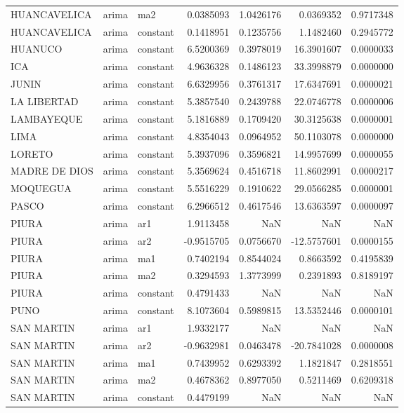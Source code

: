 \documentclass[
]{article}
\begin{document}
\begin{table}[!h]
\begin{tabular}[t]{lllrrrr}
\addlinespace
HUANCAVELICA & arima & ma2 & 0.0385093 & 1.0426176 & 0.0369352 & 0.9717348\\
HUANCAVELICA & arima & constant & 0.1418951 & 0.1235756 & 1.1482460 & 0.2945772\\
HUANUCO & arima & constant & 6.5200369 & 0.3978019 & 16.3901607 & 0.0000033\\
ICA & arima & constant & 4.9636328 & 0.1486123 & 33.3998879 & 0.0000000\\
JUNIN & arima & constant & 6.6329956 & 0.3761317 & 17.6347691 & 0.0000021\\
\addlinespace
LA LIBERTAD & arima & constant & 5.3857540 & 0.2439788 & 22.0746778 & 0.0000006\\
LAMBAYEQUE & arima & constant & 5.1816889 & 0.1709420 & 30.3125638 & 0.0000001\\
LIMA & arima & constant & 4.8354043 & 0.0964952 & 50.1103078 & 0.0000000\\
LORETO & arima & constant & 5.3937096 & 0.3596821 & 14.9957699 & 0.0000055\\
MADRE DE DIOS & arima & constant & 5.3569624 & 0.4516718 & 11.8602991 & 0.0000217\\
\addlinespace
MOQUEGUA & arima & constant & 5.5516229 & 0.1910622 & 29.0566285 & 0.0000001\\
PASCO & arima & constant & 6.2966512 & 0.4617546 & 13.6363597 & 0.0000097\\
PIURA & arima & ar1 & 1.9113458 & NaN & NaN & NaN\\
PIURA & arima & ar2 & -0.9515705 & 0.0756670 & -12.5757601 & 0.0000155\\
PIURA & arima & ma1 & 0.7402194 & 0.8544024 & 0.8663592 & 0.4195839\\
\addlinespace
PIURA & arima & ma2 & 0.3294593 & 1.3773999 & 0.2391893 & 0.8189197\\
PIURA & arima & constant & 0.4791433 & NaN & NaN & NaN\\
PUNO & arima & constant & 8.1073604 & 0.5989815 & 13.5352446 & 0.0000101\\
SAN MARTIN & arima & ar1 & 1.9332177 & NaN & NaN & NaN\\
SAN MARTIN & arima & ar2 & -0.9632981 & 0.0463478 & -20.7841028 & 0.0000008\\
\addlinespace
SAN MARTIN & arima & ma1 & 0.7439952 & 0.6293392 & 1.1821847 & 0.2818551\\
SAN MARTIN & arima & ma2 & 0.4678362 & 0.8977050 & 0.5211469 & 0.6209318\\
SAN MARTIN & arima & constant & 0.4479199 & NaN & NaN & NaN\\

\end{tabular}
\end{table}
\end{document}
